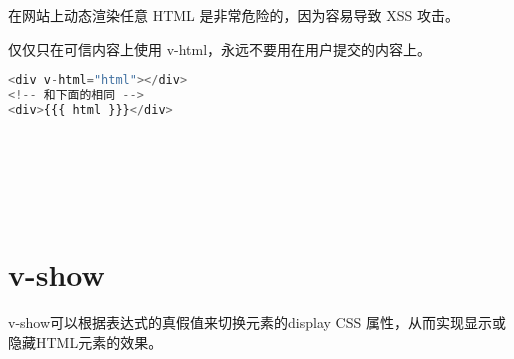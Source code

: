 在网站上动态渲染任意 HTML 是非常危险的，因为容易导致 XSS 攻击。

仅仅只在可信内容上使用 v-html，永远不要用在用户提交的内容上。


\begin{lstlisting}[language=JavaScript]
<div v-html="html"></div>
<!-- 和下面的相同 -->
<div>{{{ html }}}</div>
\end{lstlisting}



\begin{lstlisting}[language=JavaScript]

\end{lstlisting}




\begin{lstlisting}[language=JavaScript]

\end{lstlisting}




\begin{lstlisting}[language=JavaScript]

\end{lstlisting}




\begin{lstlisting}[language=JavaScript]

\end{lstlisting}




\begin{lstlisting}[language=JavaScript]

\end{lstlisting}




\begin{lstlisting}[language=JavaScript]

\end{lstlisting}




\begin{lstlisting}[language=JavaScript]

\end{lstlisting}

\section{v-show}

v-show可以根据表达式的真假值来切换元素的display CSS 属性，从而实现显示或隐藏HTML元素的效果。

